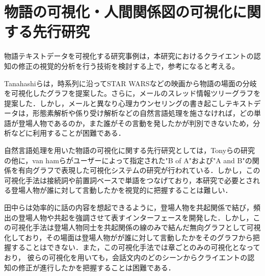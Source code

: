 \documentclass[shuuron]{kuee}
\begin{document}
\section{物語の可視化・人間関係図の可視化に関する先行研究}%

物語テキストデータを可視化する研究事例は，本研究におけるクライエントの認知の修正の視覚的分析を行う技術を検討する上で，参考になると考える。

Tanahashiら\cite{tanahashi2012design}は，時系列に沿ってSTAR WARSなどの映画から物語の場面の分岐を可視化したグラフを提案した。さらに，メールのスレッド情報ツリーグラフを提案した\cite{tanahashi2015efficient}．しかし，メールと異なり心理カウンセリングの書き起こしテキストデータは，形態素解析や係り受け解析などの自然言語処理を施さなければ，どの単語が登場人物であるのか，また誰がその言動を発したかが判別できないため，分析などに利用することが困難である．

自然言語処理を用いた物語の可視化に関する先行研究としては，Tonyら\cite{bergstrom2007seeing}の研究の他に，van hamら\cite{van2009mapping}がユーザーによって指定された"B of A"および"A and B"の関係を有向グラフで表現した可視化システムの研究が行われている．しかし，この可視化手法は接続詞や前置詞ベースで単語をつなげており，本研究で必要とされる登場人物が誰に対して言動したかを視覚的に把握することは難しい．

田中ら\cite{tanaka}は効率的に話の内容を想起できるように，登場人物を共起関係で結び，頻出の登場人物や共起を強調させて表すインターフェースを開発した．しかし，この可視化手法は登場人物同士を共起関係の線のみで結んだ無向グラフとして可視化しており，その場面は登場人物がが誰に対して言動したかをそのグラフから把握することはできない．また，この可視化手法では章ごとのみの可視化となっており， 彼らの可視化を用いても，会話文内のどのシーンからクライエントの認知の修正が進行したかを把握することは困難である．






\end{document}

